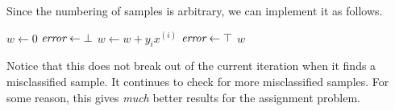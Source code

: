 Since the numbering of samples is arbitrary, we can implement it as follows.
\begin{algo}
        \State $w \gets 0$
            \State $\textit{error} \gets \bot$
                    \State $w \gets w + y_i x^{(i)}$
                    \State $\textit{error} \gets \top$
                \EndIf
            \EndFor
                \State \Return $w$
            \EndIf
        \EndFor
    \EndFn
\end{algo}
Notice that this does not break out of the current iteration when it finds
a misclassified sample.
It continues to check for more misclassified samples.
For some reason, this gives \emph{much} better results for the assignment
problem.

